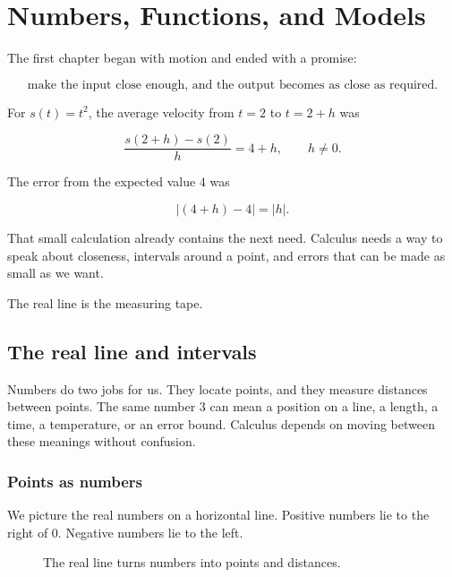 \chapter{Numbers, Functions, and Models}
\label{chap:numbers-functions-models}

The first chapter began with motion and ended with a promise:

\[
\text{make the input close enough, and the output becomes as close as required.}
\]

For \(s(t)=t^2\), the average velocity from \(t=2\) to \(t=2+h\) was

\[
\frac{s(2+h)-s(2)}{h}=4+h,
\qquad h\neq 0.
\]

The error from the expected value \(4\) was

\[
|(4+h)-4|=|h|.
\]

That small calculation already contains the next need. Calculus needs a way to speak about closeness, intervals around a point, and errors that can be made as small as we want.

The real line is the measuring tape.

\section{The real line and intervals}
\label{sec:real-line-intervals}

Numbers do two jobs for us. They locate points, and they measure distances between points. The same number \(3\) can mean a position on a line, a length, a time, a temperature, or an error bound. Calculus depends on moving between these meanings without confusion.

\subsection{Points as numbers}
\label{subsec:points-as-numbers}

We picture the real numbers on a horizontal line. Positive numbers lie to the right of \(0\). Negative numbers lie to the left.

\begin{figure}[h]
\centering
{}
\caption{The real line turns numbers into points and distances.}
\label{fig:real-line-basic}
\end{figure}

